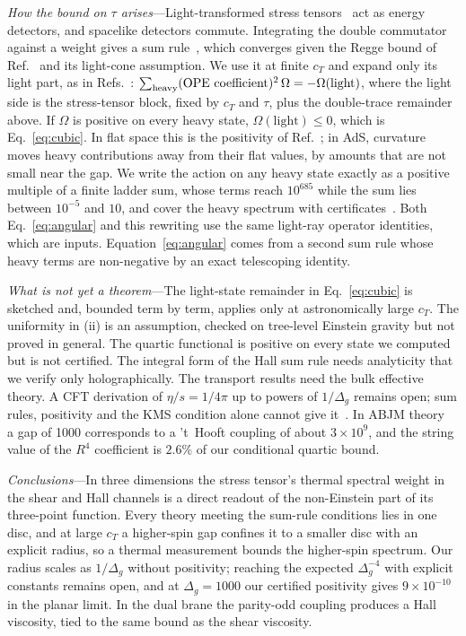 \documentclass[aps,prl,twocolumn,superscriptaddress,nofootinbib,floatfix]{revtex4-2}
\begin{document}
\textit{How the bound on $\tau$ arises}---Light-transformed stress tensors~\cite{KSDlight} act as energy detectors, and spacelike
detectors commute. Integrating the double commutator against a weight gives a sum rule~\cite{KKSDZ,CLSD,BHM}, which converges given
the Regge bound of Ref.~\cite{KKSDZ} and its light-cone assumption. We use it at finite $c_T$ and expand only its light part, as in
Refs.~\cite{CHMRS,CLSD}: $\sum_{\rm heavy}(\text{OPE coefficient})^2\,\Omega=-\Omega(\text{light})$, where the light side is the
stress-tensor block, fixed by $c_T$ and $\tau$, plus the double-trace remainder above. If $\Omega$ is positive on every heavy state,
$\Omega(\text{light})\le0$, which is Eq.~\eqref{eq:cubic}. In flat space this is the positivity of Ref.~\cite{CHLPS}; in AdS,
curvature moves heavy contributions away from their flat values, by amounts that are not small near the gap. We write the action
on any heavy state exactly as a positive multiple of a finite ladder sum, whose terms reach $10^{685}$ while the sum lies between
$10^{-5}$ and $10$, and cover the heavy spectrum with certificates~\cite{SM}. Both Eq.~\eqref{eq:angular} and this rewriting use
the same light-ray operator identities, which are inputs. Equation~\eqref{eq:angular} comes from a second sum rule whose heavy
terms are non-negative by an exact telescoping identity.

\textit{What is not yet a theorem}---The light-state remainder in Eq.~\eqref{eq:cubic} is sketched and, bounded term by term,
applies only at astronomically large $c_T$. The uniformity in (ii) is an assumption, checked on tree-level Einstein gravity but not proved in general. The quartic functional is
positive on every state we computed but is not certified. The integral form of the Hall sum rule needs analyticity that we verify
only holographically. The transport results need the bulk effective theory. A CFT derivation of $\eta/s=1/4\pi$ up to powers of
$1/\Delta_g$ remains open; sum rules, positivity and the KMS condition alone cannot give it~\cite{SM}. In ABJM theory~\cite{ABJM}
a gap of 1000 corresponds to a 't~Hooft coupling of about $3\times10^9$, and the string value of the $R^4$ coefficient is $2.6\%$ of
our conditional quartic bound.

\textit{Conclusions}---In three dimensions the stress tensor's thermal spectral weight in the shear and Hall channels is a direct
readout of the non-Einstein part of its three-point function. Every theory meeting the sum-rule conditions lies in one disc, and
at large $c_T$ a higher-spin gap confines it to a smaller disc with an explicit radius, so a thermal measurement bounds the
higher-spin spectrum. Our radius scales as $1/\Delta_g$ without positivity; reaching the expected $\Delta_g^{-4}$ with explicit
constants remains open, and at $\Delta_g=1000$ our certified positivity gives $9\times10^{-10}$ in the planar limit. In the dual
brane the parity-odd coupling produces a Hall viscosity, tied to the same bound as the shear viscosity.
\end{document}
